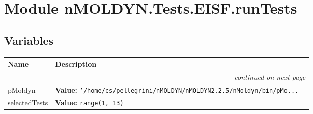 %
%
%


\section{Module nMOLDYN.Tests.EISF.runTests}

    \label{nMOLDYN:Tests:EISF:runTests}


  \subsection{Variables}

    \vspace{-1cm}
\hspace{\varindent}\begin{longtable}{|p{\varnamewidth}|p{\vardescrwidth}|l}
\cline{1-2}
\cline{1-2} \centering \textbf{Name} & \centering \textbf{Description}& \\
\cline{1-2}
\endhead\cline{1-2}\multicolumn{3}{r}{\small\textit{continued on next page}}\\\endfoot\cline{1-2}
\endlastfoot\raggedright p\-M\-o\-l\-d\-y\-n\- & \raggedright \textbf{Value:} 
{\tt '/home/cs/pellegrini/nMOLDYN/nMOLDYN2.2.5/nMoldyn/bin/pMo\texttt{...}}&\\
\cline{1-2}
\raggedright s\-e\-l\-e\-c\-t\-e\-d\-T\-e\-s\-t\-s\- & \raggedright \textbf{Value:} 
{\tt range(1, 13)}&\\
\cline{1-2}
\end{longtable}

